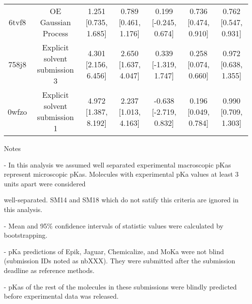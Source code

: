 \documentclass{article}
\begin{document}
\begin{center}
\begin{longtable}{|ccccccc|}
 6tvf8 &                                OE Gaussian Process &  1.251 [0.735, 1.685] &  0.789 [0.461, 1.176] &    0.199 [-0.245, 0.674] &  0.736 [0.474, 0.910] &  0.762 [0.547, 0.931] \\
 758j8 &                      Explicit solvent submission 3 &  4.301 [2.156, 6.456] &  2.650 [1.637, 4.047] &    0.339 [-1.319, 1.747] &  0.258 [0.074, 0.660] &  0.972 [0.638, 1.355] \\
 0wfzo &                      Explicit solvent submission 1 &  4.972 [1.387, 8.192] &  2.237 [1.013, 4.163] &   -0.638 [-2.719, 0.832] &  0.196 [0.049, 0.784] &  0.990 [0.709, 1.303] \\
\end{longtable}
\end{center}

Notes

- In this analysis we assumed well separated experimental macroscopic pKas represent microscopic pKas. Molecules with experimental pKa values at least 3 units apart were considered

well-separated. SM14 and SM18 which do not satify this criteria are ignored in this analysis.

- Mean and 95\% confidence intervals of statistic values were calculated by bootstrapping.

- pKa predictions of Epik, Jaguar, Chemicalize, and MoKa were not blind (submission IDs noted as nbXXX). They were submitted after the submission deadline as reference methods.

- pKas of the rest of the molecules in these submissions were blindly predicted before experimental data was released.
\end{document}
